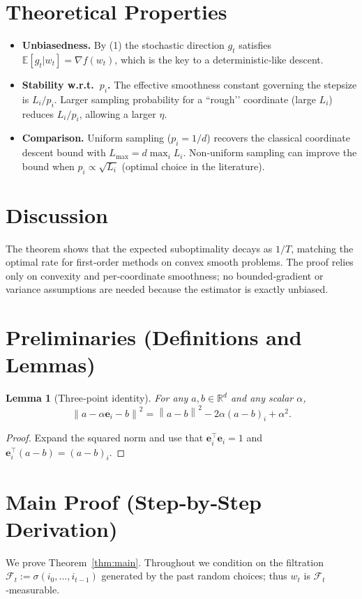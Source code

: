 \documentclass{article}
\newtheorem{lemma}{Lemma}
\newcommand{\E}{\mathbb{E}}
\newcommand{\R}{\mathbb{R}}
\newcommand{\norm}[1]{\left\lVert#1\right\rVert}
\newcommand{\grad}[1]{\nabla #1}
\newcommand{\e}{\mathbf{e}}
\begin{document}
\section*{Theoretical Properties}
\begin{itemize}[leftmargin=*]
\item \textbf{Unbiasedness.} By (1) the stochastic direction $g_t$ satisfies $\E[g_t|w_t]=\grad f(w_t)$, which is the key to a deterministic‑like descent.
\item \textbf{Stability w.r.t.\ $p_i$.} The effective smoothness constant governing the stepsize is $L_i/p_i$.  Larger sampling probability for a “rough’’ coordinate (large $L_i$) reduces $L_i/p_i$, allowing a larger $\eta$.
\item \textbf{Comparison.} Uniform sampling ($p_i=1/d$) recovers the classical coordinate descent bound with $L_{\max}=d\max_i L_i$.  Non‑uniform sampling can improve the bound when $p_i\propto\sqrt{L_i}$ (optimal choice in the literature).
\end{itemize}

\section*{Discussion}
The theorem shows that the expected suboptimality decays as $1/T$, matching the optimal rate for first‑order methods on convex smooth problems.  The proof relies only on convexity and per‑coordinate smoothness; no bounded‑gradient or variance assumptions are needed because the estimator is exactly unbiased.

\newpage
\section*{Preliminaries (Definitions and Lemmas)}
\begin{lemma}[Three‑point identity]\label{lem:3pt}
For any $a,b\in\R^{d}$ and any scalar $\alpha$,
\[
\norm{a-\alpha\e_i-b}^{2}
=\norm{a-b}^{2}-2\alpha (a-b)_i+\alpha^{2}.
\tag{4}
\]
\end{lemma}
\begin{proof}
Expand the squared norm and use that $\e_i^{\top}\e_i=1$ and $\e_i^{\top}(a-b)= (a-b)_i$.
\end{proof}

\section*{Main Proof (Step‑by‑Step Derivation)}
We prove Theorem~\ref{thm:main}.  Throughout we condition on the filtration $\mathcal{F}_t:=\sigma(i_0,\dots,i_{t-1})$ generated by the past random choices; thus $w_t$ is $\mathcal{F}_t$‑measurable.
\end{document}
